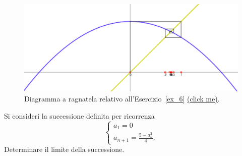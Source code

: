\documentclass[italian,a4paper]{scrartcl}
\newcommand{\online}[1]{\href{http://paolini.github.io/recurrence/?#1}{\underline{(click
      me)}}}
\begin{document}
\begin{figure}
  \begin{center}
    \includegraphics[width=\textwidth]{fig_ex_6.png}
  \end{center}
  \caption{Diagramma a ragnatela relativo
    all'Esercizio~\ref{ex_6} \online{expr=(5-x*x)\%2F4&x=0&scale=120}.}
  \label{fig_ex_6}
\end{figure}

\begin{exercise}\label{ex_6}
  Si consideri la successione definita per ricorrenza
  \[
  \begin{cases}
    a_1 = 0\\
    a_{n+1} = \frac{5-a_n^2}{4}.
  \end{cases}
  \]
  Determinare il limite della successione.
\end{exercise}
\end{document}
